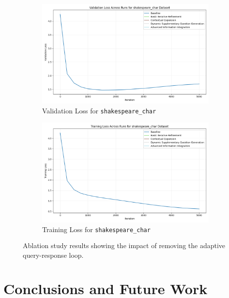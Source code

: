 \documentclass{article} %
\begin{document}
\begin{figure}[h]
    \centering
    \begin{subfigure}{0.49\textwidth}
        \includegraphics[width=\textwidth]{val_loss_shakespeare_char.png}
        \caption{Validation Loss for \texttt{shakespeare\_char}}
        \label{fig:val_loss_shakespeare_char}
    \end{subfigure}
    \hfill
    \begin{subfigure}{0.49\textwidth}
        \includegraphics[width=\textwidth]{train_loss_shakespeare_char.png}
        \caption{Training Loss for \texttt{shakespeare\_char}}
        \label{fig:train_loss_shakespeare_char}
    \end{subfigure}
    \caption{Ablation study results showing the impact of removing the adaptive query-response loop.}
    \label{fig:ablation}
\end{figure}

\section{Conclusions and Future Work}
\label{sec:conclusion}
\end{document}
